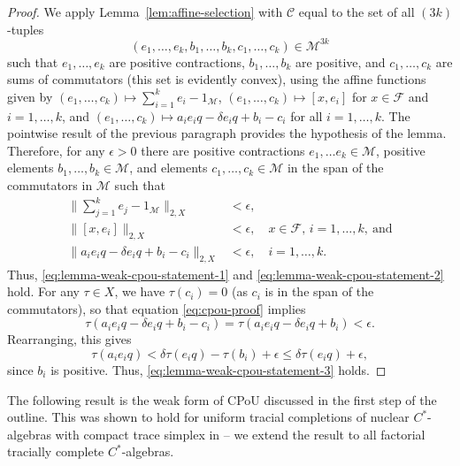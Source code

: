 \documentclass[a4paper,11pt]{amsart}
\theoremstyle{definition}
\numberwithin{equation}{section}
\numberwithin{theorem}{section}
\newcommand{\F}{\mathcal F}
\newcommand{\M}{\mathcal{M}}
\begin{document}
\begin{proof}
We apply Lemma~\ref{lem:affine-selection} with $\mathcal C$ equal to the set of all $(3k)$-tuples \begin{equation}
 (e_1,\dots,e_k,b_1,\dots,b_k,c_1,\dots,c_k)\in \mathcal M^{3k}   
\end{equation} such that $e_1,\dots,e_k$ are positive contractions, $b_1,\dots,b_k$ are positive, and $c_1,\dots,c_k$ are sums of commutators (this set is evidently convex), using the affine functions given by $(e_1,\dots,c_k)\mapsto \sum_{i=1}^k e_i-1_{\mathcal M}$, $(e_1,\dots,c_k) \mapsto [x,e_i]$ for $x\in \mathcal F$ and $i=1,\dots,k$, and $(e_1,\dots,c_k) \mapsto a_i e_i q - \delta e_iq + b_i-c_i$ for all $i = 1, \ldots, k$.  The pointwise result of the previous paragraph provides the hypothesis of the lemma. Therefore, for any $\epsilon>0$ there are positive contractions $e_1, \ldots e_k \in \M$, positive elements $b_1, \ldots, b_k \in \M$, and elements $c_1, \ldots, c_k \in \M$ in the span of the commutators in $\M$ such that 
		\begin{equation} \begin{array}{rlrl}
		\Big\|\sum_{j=1}^k e_j - 1_\mathcal M \Big\|_{2, X} &< \epsilon,   \\
        \|[x, e_i]\|_{2, X} &< \epsilon, \quad x \in \F, \, i = 1, \ldots, k,\ \text{and}  \\
		\|a_i e_i q - \delta e_iq + b_i-c_i\|_{2, X} &< \epsilon,  \quad i = 1, \ldots, k. \label{eq:cpou-proof}
	\end{array}\end{equation}
        Thus, \eqref{eq:lemma-weak-cpou-statement-1} and \eqref{eq:lemma-weak-cpou-statement-2} hold.
	For any $\tau\in X$, we have $\tau(c_i)=0$ (as $c_i$ is in the span of the commutators), so that equation \eqref{eq:cpou-proof} implies
	\begin{equation}
		\tau(a_i e_i q - \delta e_iq + b_i-c_i)=\tau(a_i e_i q - \delta e_iq + b_i) < \epsilon.
	\end{equation}
	Rearranging, this gives
	\begin{equation}
		\tau(a_i e_iq) < \delta \tau(e_iq) - \tau(b_i) + \epsilon \leq \delta \tau(e_iq) + \epsilon,
	\end{equation}
	since $b_i$ is positive.  Thus, \eqref{eq:lemma-weak-cpou-statement-3} holds. 
\end{proof}


The following result is the weak form of CPoU discussed in the first step of the outline.  This was shown to hold for uniform tracial completions of nuclear $C^*$-algebras with compact trace simplex in \cite[Lemma~3.6]{CETWW} -- we extend the result to all factorial tracially complete $C^*$-algebras. 
\end{document}
